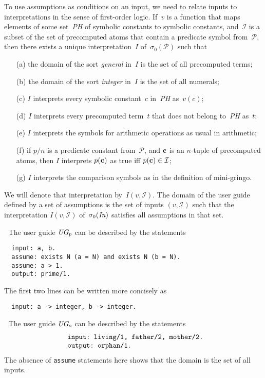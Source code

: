 \documentclass{tlp}
\def\beq{\begin{equation}}
\def\eeq#1{\label{#1}\end{equation}}
\def\ba{\begin{array}}
\def\ea{\end{array}}
\def\gringo{{\sc gringo}}
\newcommand{\I}{\mathcal{I}}
\newcommand{\PP}{\mathcal{P}}
\begin{document}
To use assumptions as conditions on an input, we need to relate inputs
to interpretations in the sense of first-order logic.
If~$v$ is a function that maps elements of some set~\emph{PH} of
symbolic constants to symbolic constants, and~$\I$ is a subset of the set of
precomputed atoms that contain a predicate symbol from~$\PP$,
then there exists a unique interpretation~$I$ of~$\sigma_0(\PP)$ such that
\begin{itemize}
\item[(a)]
the domain of the sort \emph{general} in~$I$
  is the set of all precomputed terms;
\item[(b)]
the domain of the sort \emph{integer} in~$I$ is the set of all numerals;
\item[(c)] $I$ interprets every symbolic constant~$c$ in~\emph{PH}
  as~$v(c)$;
\item[(d)] $I$ interprets every precomputed term~$t$ that does not
  belong to~\emph{PH} as~$t$;
\item[(e)] $I$ interprets the symbols for arithmetic operations
  as usual in arithmetic;
\item[(f)] if $p/n$ is a predicate constant from~$\PP$, and $\bf c$
  is an $n$-tuple of precomputed atoms, then $I$ interprets
  $p({\bf c})$ as true iff $p({\bf c})\in\I$;
\item[(g)] $I$ interprets the comparison symbols as in the definition of
  mini-\gringo.
\end{itemize}
We will denote that interpretation by~$I(v,\I)$.
The domain of the user guide defined by a set of assumptions is the set
of inputs $(v,\I)$ such that the interpretation $I(v,\I)$
of~$\sigma_0(\emph{In})$ satisfies all assumptions in that set.

\medskip{}$\;$ The user guide $\emph{UG}_p$
can be described by the statements
\begin{verbatim}
  input: a, b.
  assume: exists N (a = N) and exists N (b = N).
  assume: a > 1.
  output: prime/1.
\end{verbatim}
The first two lines can be written more concisely as
\begin{verbatim}
  input: a -> integer, b -> integer.
\end{verbatim}

\medskip{}$\;$ The user guide $\emph{UG}_o$
can be described by the statements
\beq\ba l
\verb| input: living/1, father/2, mother/2.|\\
\verb| output: orphan/1.|
\ea\eeq{ugo}
The absence of \verb|assume| statements here shows that the domain
is the set of all inputs.
\end{document}
